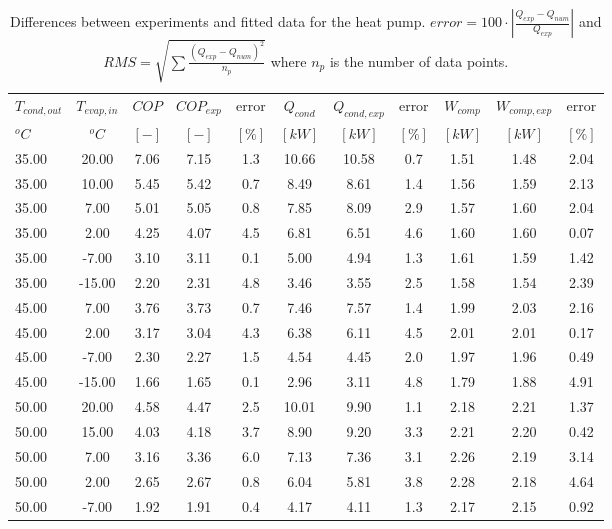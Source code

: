 \documentclass[english]{SPFShortReport}
\begin{document}
\begin{table}[!ht]
\begin{small}
\caption{Differences between experiments and fitted data for the heat pump.          $error=100 \cdot |\frac{Q_{exp}-Q_{num}}{Q_{exp}}|$ and $RMS = \sqrt { \sum{\frac{(Q_{exp}-Q_{num})^2}{n_p}} }$ where $n_p$ is the number of data points.}
\begin{center}
\resizebox{12cm}{!} 
{
\begin{tabular}{l | c c c c c c c c c c } 
\hline
\hline
$T_{cond,out}$ &$T_{evap,in}$ &$COP$ &$COP_{exp}$ &error &$Q_{cond}$ &$Q_{cond,exp}$ &error &$W_{comp}$ &$W_{comp,exp}$ &error \\ 
$^oC$ &$^oC$ &$[-]$ &$[-]$ &$[\%]$ &$[kW]$ &$[kW]$ &$[\%]$ &$[kW]$ &$[kW]$ &$[\%]$\\ 
\hline
35.00  & 20.00 & 7.06 & 7.15 & 1.3 & 10.66 & 10.58 & 0.7 & 1.51 & 1.48 & 2.04\\ 
35.00  & 10.00 & 5.45 & 5.42 & 0.7 & 8.49 & 8.61 & 1.4 & 1.56 & 1.59 & 2.13\\ 
35.00  & 7.00 & 5.01 & 5.05 & 0.8 & 7.85 & 8.09 & 2.9 & 1.57 & 1.60 & 2.04\\ 
35.00  & 2.00 & 4.25 & 4.07 & 4.5 & 6.81 & 6.51 & 4.6 & 1.60 & 1.60 & 0.07\\ 
35.00  & -7.00 & 3.10 & 3.11 & 0.1 & 5.00 & 4.94 & 1.3 & 1.61 & 1.59 & 1.42\\ 
35.00  & -15.00 & 2.20 & 2.31 & 4.8 & 3.46 & 3.55 & 2.5 & 1.58 & 1.54 & 2.39\\ 
45.00  & 7.00 & 3.76 & 3.73 & 0.7 & 7.46 & 7.57 & 1.4 & 1.99 & 2.03 & 2.16\\ 
45.00  & 2.00 & 3.17 & 3.04 & 4.3 & 6.38 & 6.11 & 4.5 & 2.01 & 2.01 & 0.17\\ 
45.00  & -7.00 & 2.30 & 2.27 & 1.5 & 4.54 & 4.45 & 2.0 & 1.97 & 1.96 & 0.49\\ 
45.00  & -15.00 & 1.66 & 1.65 & 0.1 & 2.96 & 3.11 & 4.8 & 1.79 & 1.88 & 4.91\\ 
50.00  & 20.00 & 4.58 & 4.47 & 2.5 & 10.01 & 9.90 & 1.1 & 2.18 & 2.21 & 1.37\\ 
50.00  & 15.00 & 4.03 & 4.18 & 3.7 & 8.90 & 9.20 & 3.3 & 2.21 & 2.20 & 0.42\\ 
50.00  & 7.00 & 3.16 & 3.36 & 6.0 & 7.13 & 7.36 & 3.1 & 2.26 & 2.19 & 3.14\\ 
50.00  & 2.00 & 2.65 & 2.67 & 0.8 & 6.04 & 5.81 & 3.8 & 2.28 & 2.18 & 4.64\\ 
50.00  & -7.00 & 1.92 & 1.91 & 0.4 & 4.17 & 4.11 & 1.3 & 2.17 & 2.15 & 0.92\\ 

\end{tabular}}
\end{center}
\end{small}
\end{table}
\end{document}
